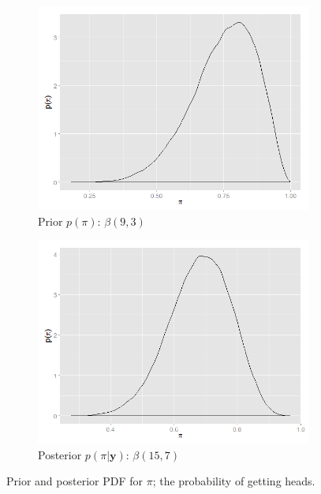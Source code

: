 \begin{figure}
\centering
\captionsetup{justification=centering}
	\begin{subfigure}[b]{0.45\textwidth}
		\includegraphics[width=\textwidth]{mainmatter/chapter_2_bayesian_paradigm/beta_prior.png}
        \caption{Prior $p(\pi)$: $\beta(9,3)$}
        \label{subfig : toy_problem_prior}
	\end{subfigure}
    	\begin{subfigure}[b]{0.45\textwidth}
		\includegraphics[width=\textwidth]{mainmatter/chapter_2_bayesian_paradigm/beta_posterior.png}
        \caption{Posterior $p(\pi|\boldsymbol{y})$: $\beta(15,7)$}
        \label{subfig : toy_problem_posterior}
	\end{subfigure}
\caption{Prior and posterior PDF for $\pi$; the probability of getting heads.}
\end{figure}

